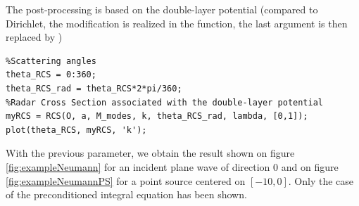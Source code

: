The post-processing is based on the double-layer potential (compared to Dirichlet, the modification is realized in the \RCS function, the
 last argument \code{[1,0]} is then replaced by  \code{[0,1]})
\begin{lstlisting}
%Scattering angles
theta_RCS = 0:360;
theta_RCS_rad = theta_RCS*2*pi/360;
%Radar Cross Section associated with the double-layer potential
myRCS = RCS(O, a, M_modes, k, theta_RCS_rad, lambda, [0,1]);
plot(theta_RCS, myRCS, 'k');
\end{lstlisting}

With the previous parameter, we obtain the result shown on figure \ref{fig:exampleNeumann} for an incident plane wave of direction $0$ and on figure \ref{fig:exampleNeumannPS} for a point source centered on $[-10,0]$. Only the case of the preconditioned integral equation has been shown.


